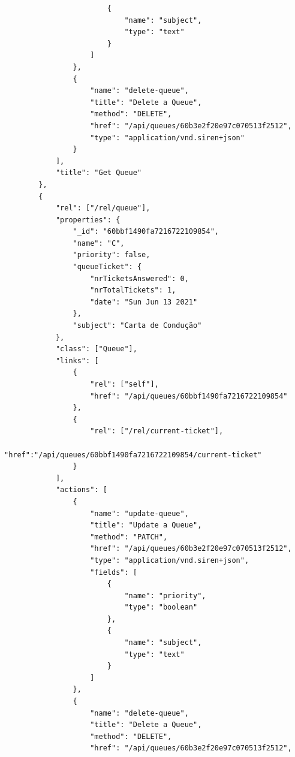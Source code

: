 \documentclass[12pt,a4paper]{article}
\begin{document}
\begin{verbatim}
                        {
                            "name": "subject",                                
                            "type": "text"
                        }                         
                    ]                     
                },                     
                {
                    "name": "delete-queue",
                    "title": "Delete a Queue",
                    "method": "DELETE",
                    "href": "/api/queues/60b3e2f20e97c070513f2512",
                    "type": "application/vnd.siren+json"                     
                }                 
            ],
            "title": "Get Queue"             
        },
        {
            "rel": ["/rel/queue"],
            "properties": {                     
                "_id": "60bbf1490fa7216722109854",
                "name": "C",
                "priority": false,
                "queueTicket": {
                    "nrTicketsAnswered": 0,                         
                    "nrTotalTickets": 1,
                    "date": "Sun Jun 13 2021"
                },
                "subject": "Carta de Condução"                 
            },
            "class": ["Queue"],
            "links": [                     
                {                         
                    "rel": ["self"],
                    "href": "/api/queues/60bbf1490fa7216722109854"        
                },
                {
                    "rel": ["/rel/current-ticket"],                         
                    "href":"/api/queues/60bbf1490fa7216722109854/current-ticket"
                }
            ],
            "actions": [
                {
                    "name": "update-queue",
                    "title": "Update a Queue",
                    "method": "PATCH",
                    "href": "/api/queues/60b3e2f20e97c070513f2512",
                    "type": "application/vnd.siren+json",
                    "fields": [                             
                        {
                            "name": "priority",
                            "type": "boolean"
                        },              
                        {
                            "name": "subject",                                
                            "type": "text"
                        }                         
                    ]                     
                },                     
                {
                    "name": "delete-queue",
                    "title": "Delete a Queue",
                    "method": "DELETE",
                    "href": "/api/queues/60b3e2f20e97c070513f2512",

\end{verbatim}
\end{document}
